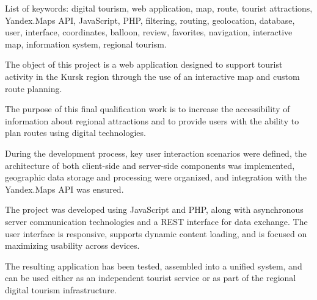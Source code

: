 List of keywords: digital tourism, web application, map, route, tourist attractions, Yandex.Maps API, JavaScript, PHP, filtering, routing, geolocation, database, user, interface, coordinates, balloon, review, favorites, navigation, interactive map, information system, regional tourism.

The object of this project is a web application designed to support tourist activity in the Kursk region through the use of an interactive map and custom route planning.

The purpose of this final qualification work is to increase the accessibility of information about regional attractions and to provide users with the ability to plan routes using digital technologies.

During the development process, key user interaction scenarios were defined, the architecture of both client-side and server-side components was implemented, geographic data storage and processing were organized, and integration with the Yandex.Maps API was ensured.

The project was developed using JavaScript and PHP, along with asynchronous server communication technologies and a REST interface for data exchange. The user interface is responsive, supports dynamic content loading, and is focused on maximizing usability across devices.

The resulting application has been tested, assembled into a unified system, and can be used either as an independent tourist service or as part of the regional digital tourism infrastructure.
